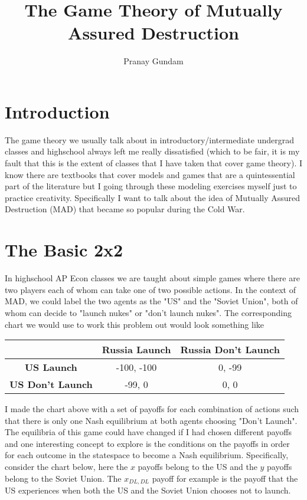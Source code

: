 \documentclass[11pt,english]{article}
\title{\textbf{The Game Theory of Mutually Assured Destruction}}
\author{Pranay Gundam}
\begin{document}
\maketitle

\section*{Introduction}

The game theory we usually talk about in introductory/intermediate undergrad classes and highschool always left me really dissatisfied (which to be fair, it is my fault that this is the extent of classes that I have taken that cover game theory). I know there are textbooks that cover models and games that are a quintessential part of the literature but I going through these modeling exercises myself just to practice creativity. Specifically I want to talk about the idea of Mutually Assured Destruction (MAD) that became so popular during the Cold War.


\section*{The Basic 2x2}
In highschool AP Econ classes we are taught about simple games where there are two players each of whom can take one of two possible actions. In the context of MAD, we could label the two agents as the "US" and the "Soviet Union", both of whom can decide to "launch nukes" or "don't launch nukes". The corresponding chart we would use to work this problem out would look something like 

\begin{center}
\begin{tabular}{ c |c |c| }
  & \textbf{Russia Launch} & \textbf{Russia Don't Launch}\\
\hline 
\textbf{US Launch} & -100, -100 & 0, -99  \\
\hline  
\textbf{US Don't Launch} & -99, 0 & 0, 0 \\
\hline
\end{tabular}
\end{center}

\noindent I made the chart above with a set of payoffs for each combination of actions such that there is only one Nash equilibrium at both agents choosing "Don't Launch". The equilibria of this game could have changed if I had chosen different payoffs and one interesting concept to explore is the conditions on the payoffs in order for each outcome in the statespace to become a Nash equilibrium. Specifically, consider the chart below, here the $x$ payoffs belong to the US and the $y$ payoffs belong to the Soviet Union. The $x_{DL,DL}$ payoff for example is the payoff that the US experiences when both the US and the Soviet Union chooses not to launch.
\end{document}
